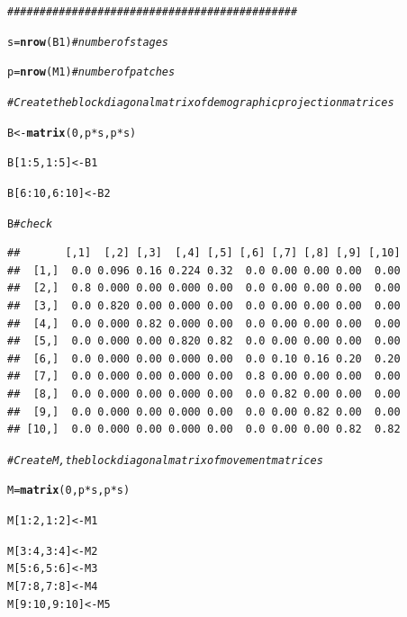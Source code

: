 \documentclass{article}\usepackage[]{graphicx}\usepackage[]{color}
\makeatletter
\newcommand{\hlnum}[1]{\textcolor[rgb]{0.686,0.059,0.569}{#1}}%
\newcommand{\hlcom}[1]{\textcolor[rgb]{0.678,0.584,0.686}{\textit{#1}}}%
\newcommand{\hlopt}[1]{\textcolor[rgb]{0,0,0}{#1}}%
\newcommand{\hlstd}[1]{\textcolor[rgb]{0.345,0.345,0.345}{#1}}%
\newcommand{\hlkwb}[1]{\textcolor[rgb]{0.69,0.353,0.396}{#1}}%
\newcommand{\hlkwd}[1]{\textcolor[rgb]{0.737,0.353,0.396}{\textbf{#1}}}%
\newenvironment{kframe}{%
 \def\at@end@of@kframe{}%
 \ifinner\ifhmode%
  \def\at@end@of@kframe{\end{minipage}}%
  \begin{minipage}{\columnwidth}%
 \fi\fi%
 \def\FrameCommand##1{\hskip\@totalleftmargin \hskip-\fboxsep
 \colorbox{shadecolor}{##1}\hskip-\fboxsep
     \hskip-\linewidth \hskip-\@totalleftmargin \hskip\columnwidth}%
 \MakeFramed {\advance\hsize-\width
   \@totalleftmargin\z@ \linewidth\hsize
   \@setminipage}}%
 {\par\unskip\endMakeFramed%
 \at@end@of@kframe}
\newenvironment{knitrout}{}{} %
\makeatother
\begin{document}
\begin{knitrout}
\color{fgcolor}\begin{kframe}
\begin{alltt}
\hlcom{#############################################}

\hlstd{s}\hlkwb{=}\hlkwd{nrow}\hlstd{(B1)} \hlcom{# number of stages}

\hlstd{p}\hlkwb{=}\hlkwd{nrow}\hlstd{(M1)} \hlcom{# number of patches}


\hlcom{# Create the block diagonal matrix of demographic projection matrices}

\hlstd{B}\hlkwb{<-}\hlkwd{matrix}\hlstd{(}\hlnum{0}\hlstd{,p}\hlopt{*}\hlstd{s,p}\hlopt{*}\hlstd{s)}

\hlstd{B[}\hlnum{1}\hlopt{:}\hlnum{5}\hlstd{,}\hlnum{1}\hlopt{:}\hlnum{5}\hlstd{]}\hlkwb{<-}\hlstd{B1}

\hlstd{B[}\hlnum{6}\hlopt{:}\hlnum{10}\hlstd{,}\hlnum{6}\hlopt{:}\hlnum{10}\hlstd{]}\hlkwb{<-}\hlstd{B2}

\hlstd{B} \hlcom{#check}
\end{alltt}
\begin{verbatim}
##       [,1]  [,2] [,3]  [,4] [,5] [,6] [,7] [,8] [,9] [,10]
##  [1,]  0.0 0.096 0.16 0.224 0.32  0.0 0.00 0.00 0.00  0.00
##  [2,]  0.8 0.000 0.00 0.000 0.00  0.0 0.00 0.00 0.00  0.00
##  [3,]  0.0 0.820 0.00 0.000 0.00  0.0 0.00 0.00 0.00  0.00
##  [4,]  0.0 0.000 0.82 0.000 0.00  0.0 0.00 0.00 0.00  0.00
##  [5,]  0.0 0.000 0.00 0.820 0.82  0.0 0.00 0.00 0.00  0.00
##  [6,]  0.0 0.000 0.00 0.000 0.00  0.0 0.10 0.16 0.20  0.20
##  [7,]  0.0 0.000 0.00 0.000 0.00  0.8 0.00 0.00 0.00  0.00
##  [8,]  0.0 0.000 0.00 0.000 0.00  0.0 0.82 0.00 0.00  0.00
##  [9,]  0.0 0.000 0.00 0.000 0.00  0.0 0.00 0.82 0.00  0.00
## [10,]  0.0 0.000 0.00 0.000 0.00  0.0 0.00 0.00 0.82  0.82
\end{verbatim}
\begin{alltt}
\hlcom{# Create M, the block diagonal matrix of movement matrices}

\hlstd{M}\hlkwb{=}\hlkwd{matrix}\hlstd{(}\hlnum{0}\hlstd{,p}\hlopt{*}\hlstd{s,p}\hlopt{*}\hlstd{s)}

\hlstd{M[}\hlnum{1}\hlopt{:}\hlnum{2}\hlstd{,}\hlnum{1}\hlopt{:}\hlnum{2}\hlstd{]}\hlkwb{<-}\hlstd{M1}

\hlstd{M[}\hlnum{3}\hlopt{:}\hlnum{4}\hlstd{,}\hlnum{3}\hlopt{:}\hlnum{4}\hlstd{]}\hlkwb{<-}\hlstd{M2}
\hlstd{M[}\hlnum{5}\hlopt{:}\hlnum{6}\hlstd{,}\hlnum{5}\hlopt{:}\hlnum{6}\hlstd{]}\hlkwb{<-}\hlstd{M3}
\hlstd{M[}\hlnum{7}\hlopt{:}\hlnum{8}\hlstd{,}\hlnum{7}\hlopt{:}\hlnum{8}\hlstd{]}\hlkwb{<-}\hlstd{M4}
\hlstd{M[}\hlnum{9}\hlopt{:}\hlnum{10}\hlstd{,}\hlnum{9}\hlopt{:}\hlnum{10}\hlstd{]}\hlkwb{<-}\hlstd{M5}


\end{alltt}
\end{kframe}
\end{knitrout}
\end{document}
